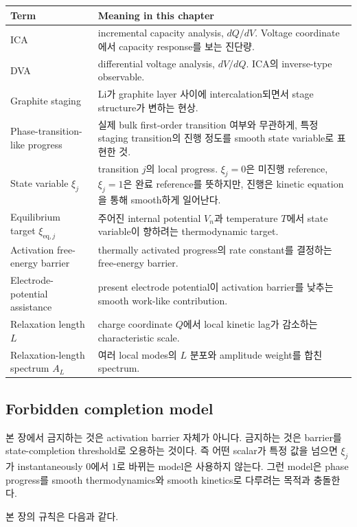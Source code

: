 \documentclass[11pt]{article}
\newcommand{\eq}{\mathrm{eq}}
\begin{document}
\begin{longtable}{p{} p{}}
\toprule
Term & Meaning in this chapter \\
\midrule
\endhead
ICA & incremental capacity analysis, \(dQ/dV\). Voltage coordinate에서 capacity response를 보는 진단량. \\
DVA & differential voltage analysis, \(dV/dQ\). ICA의 inverse-type observable. \\
Graphite staging & Li가 graphite layer 사이에 intercalation되면서 stage structure가 변하는 현상. \\
Phase-transition-like progress & 실제 bulk first-order transition 여부와 무관하게, 특정 staging transition의 진행 정도를 smooth state variable로 표현한 것. \\
State variable \(\xi_j\) & transition \(j\)의 local progress. \(\xi_j=0\)은 미진행 reference, \(\xi_j=1\)은 완료 reference를 뜻하지만, 진행은 kinetic equation을 통해 smooth하게 일어난다. \\
Equilibrium target \(\xi_{\eq,j}\) & 주어진 internal potential \(V_n\)과 temperature \(T\)에서 state variable이 향하려는 thermodynamic target. \\
Activation free-energy barrier & thermally activated progress의 rate constant를 결정하는 free-energy barrier. \\
Electrode-potential assistance & present electrode potential이 activation barrier를 낮추는 smooth work-like contribution. \\
Relaxation length \(L\) & charge coordinate \(Q\)에서 local kinetic lag가 감소하는 characteristic scale. \\
Relaxation-length spectrum \(A_L\) & 여러 local modes의 \(L\) 분포와 amplitude weight를 합친 spectrum. \\
\bottomrule
\end{longtable}

\subsection{Forbidden completion model}\label{subsec:forbidden}

본 장에서 금지하는 것은 activation barrier 자체가 아니다. 금지하는 것은 barrier를
state-completion threshold로 오용하는 것이다. 즉 어떤 scalar가 특정 값을 넘으면
\(\xi_j\)가 instantaneously \(0\)에서 \(1\)로 바뀌는 model은 사용하지 않는다. 그런 model은
phase progress를 smooth thermodynamics와 smooth kinetics로 다루려는 목적과 충돌한다.

본 장의 규칙은 다음과 같다.
\end{document}
